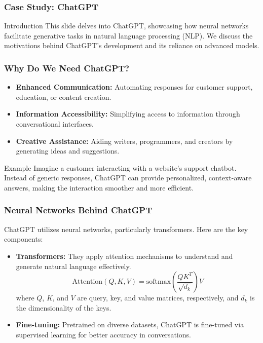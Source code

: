 \documentclass[aspectratio=169]{beamer}
\begin{document}
\begin{frame}[fragile]
    \frametitle{Case Study: ChatGPT}
    \begin{block}{Introduction}
      This slide delves into ChatGPT, showcasing how neural networks facilitate generative tasks in natural language processing (NLP). We discuss the motivations behind ChatGPT's development and its reliance on advanced models.
    \end{block}
\end{frame}

\begin{frame}[fragile]
    \frametitle{Why Do We Need ChatGPT?}
    \begin{itemize}
        \item \textbf{Enhanced Communication:} Automating responses for customer support, education, or content creation.
        \item \textbf{Information Accessibility:} Simplifying access to information through conversational interfaces.
        \item \textbf{Creative Assistance:} Aiding writers, programmers, and creators by generating ideas and suggestions.
    \end{itemize}
    
    \begin{block}{Example}
      Imagine a customer interacting with a website's support chatbot. Instead of generic responses, ChatGPT can provide personalized, context-aware answers, making the interaction smoother and more efficient.
    \end{block}
\end{frame}

\begin{frame}[fragile]
    \frametitle{Neural Networks Behind ChatGPT}
    ChatGPT utilizes neural networks, particularly transformers. Here are the key components:
    \begin{itemize}
        \item \textbf{Transformers:} They apply attention mechanisms to understand and generate natural language effectively.
        \begin{equation}
            \text{Attention}(Q, K, V) = \text{softmax}\left(\frac{QK^T}{\sqrt{d_k}}\right)V
        \end{equation}
        where \(Q\), \(K\), and \(V\) are query, key, and value matrices, respectively, and \(d_k\) is the dimensionality of the keys.
        
        \item \textbf{Fine-tuning:} Pretrained on diverse datasets, ChatGPT is fine-tuned via supervised learning for better accuracy in conversations.
    \end{itemize}
\end{frame}
\end{document}

